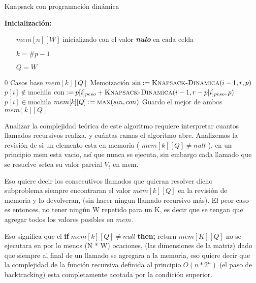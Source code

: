 \documentclass[fleqn, 11pt]{article}
\def\nulo{\textbf{\textit{nulo}}}
\begin{document}
\begin{algorithm}
\caption{Knapsack con programación dinámica}
\begin{algorithmic}[1]
\item[\textbf{Inicialización:}]
\item[] \begin{itemize}
	\item[] $mem[n][W]$ inicializado con el valor \nulo{} en cada celda
	\item[] $k = \#p - 1$
	\item[] $Q = W$
\end{itemize}
\Statex
{}
	\State \Return $0$
\Comment Casos base
\EndIf
	\If{$mem[k][Q] \neq \nulo$}
	\State	\Return $mem[k][Q]$
	\Comment Memoización
\EndIf
\State $\text{sin} := \Call{Knapsack-Dinamica}{i - 1, r, p}$
\Comment $p[i] \not \in \text{mochila}$
	\State $\text{con} := p[i]_{peso} + \Call{Knapsack-Dinamica}{i - 1, r - p[i]_{peso}, p}$
\Comment $p[i] \in \text{mochila}$
\State $mem[k][Q] := \Call{max}{sin, con}$
\Comment Guardo el mejor de ambos
\State \Return $mem[k][Q]$
\EndFunction
\end{algorithmic}
\end{algorithm}

Analizar la complejidad teórica de este algoritmo requiere interpretar cuantos llamados recursivos realiza, y cuántas ramas el algoritmo abre. Analizemos la revisión de si un elemento esta en memoria ( $mem[k][Q] \neq null$ ), en un principio mem esta vacio,  así que nunca se ejecuta, sin embargo cada llamado que se resuelve setea su valor parcial \textit{$V_t$} en mem.

Eso quiere decir los consecutivos llamados que quieran resolver dicho subproblema siempre encontraran el valor $mem[k][Q]$ en la revisión de memoria y lo devolveran, (sin hacer ningun llamado recursivo más). El peor caso es entonces, no tener ningún W repetido para un K, es decir que se tengan que agregar todos los valores posibles en $mem$.

Eso significa que el \textbf{if} $mem[k][Q] \neq null$ \textbf{then;} return $mem[K][Q]$ no se ejecutara en por lo menos (N * W) ocaciones, (las dimensiones de la matriz) dado que siempre al final de un llamado se agregara a la memoria, eso quiere decir que la complejidad de la función recursiva definida al principio $O(n*2^n)$ (el paso de backtracking) esta completamente acotada por la condición superior. \\
\end{document}
